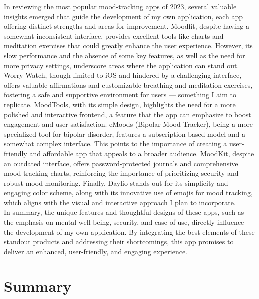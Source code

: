 In reviewing the most popular mood-tracking apps of 2023, several valuable insights emerged that guide the development of my own application, each app offering distinct strengths and areas for improvement. Moodfit, despite having a somewhat inconsistent interface, provides excellent tools like charts and meditation exercises that could greatly enhance the user experience. However, its slow performance and the absence of some key features, as well as the need for more privacy settings, underscore areas where the application can stand out. Worry Watch, though limited to iOS and hindered by a challenging interface, offers valuable affirmations and customizable breathing and meditation exercises, fostering a safe and supportive environment for users — something I aim to replicate. MoodTools, with its simple design, highlights the need for a more polished and interactive frontend, a feature that the app can emphasize to boost engagement and user satisfaction. eMoods (Bipolar Mood Tracker), being a more specialized tool for bipolar disorder, features a subscription-based model and a somewhat complex interface. This points to the importance of creating a user-friendly and affordable app that appeals to a broader audience. MoodKit, despite an outdated interface, offers password-protected journals and comprehensive mood-tracking charts, reinforcing the importance of prioritizing security and robust mood monitoring. Finally, Daylio stands out for its simplicity and engaging color scheme, along with its innovative use of emojis for mood tracking, which aligns with the visual and interactive approach I plan to incorporate.\vspace{5mm} \\
In summary, the unique features and thoughtful designs of these apps, such as the emphasis on mental well-being, security, and ease of use, directly influence the development of my own application. By integrating the best elements of these standout products and addressing their shortcomings, this app promises to deliver an enhanced, user-friendly, and engaging experience.

\section{Summary}

